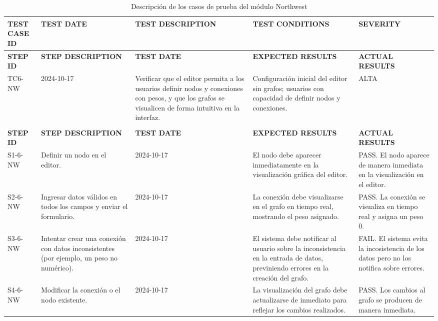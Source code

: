 \begin{longtable}{|p{2cm}|p{3cm}|p{3cm}|p{3cm}|p{3cm}|}
\caption{Descripción de los casos de prueba del módulo Northwest} \label{tab:casos_prueba} \\
\hline
\textbf{TEST CASE ID} & \textbf{TEST DATE} & \textbf{TEST DESCRIPTION} & \textbf{TEST CONDITIONS} & \textbf{SEVERITY                                                                                       \\} \\ \hline
\endfirsthead
\hline
\textbf{STEP ID} & \textbf{STEP DESCRIPTION} & \textbf{TEST DATE} & \textbf{EXPECTED RESULTS} & \textbf{ACTUAL RESULTS} \\ \hline
\endhead
TC6-NW & 2024-10-17 & Verificar que el editor permita a los usuarios definir nodos y conexiones con pesos, y que los grafos se visualicen de forma intuitiva en la interfaz. & Configuración inicial del editor sin grafos; usuarios con capacidad de definir nodos y conexiones. & ALTA                                                                                           \\ \\ \hline
\textbf{STEP ID} & \textbf{STEP DESCRIPTION} & \textbf{TEST DATE} & \textbf{EXPECTED RESULTS} & \textbf{ACTUAL RESULTS} \\ \hline
S1-6-NW & Definir un nodo en el editor. & 2024-10-17 & El nodo debe aparecer inmediatamente en la visualización gráfica del editor. & PASS. El nodo aparece de manera inmediata en la visualización en el editor. \\ \hline
S2-6-NW & Ingresar datos válidos en todos los campos y enviar el formulario. & 2024-10-17 & La conexión debe visualizarse en el grafo en tiempo real, mostrando el peso asignado. & PASS. La conexión se visualiza en tiempo real y asigna un peso 0. \\ \hline
S3-6-NW & Intentar crear una conexión con datos inconsistentes (por ejemplo, un peso no numérico). & 2024-10-17 & El sistema debe notificar al usuario sobre la inconsistencia en la entrada de datos, previniendo errores en la creación del grafo. & FAIL. El sistema evita la incosistencia de los datos pero no los notifica sobre errores. \\ \hline
S4-6-NW & Modificar la conexión o el nodo existente. & 2024-10-17 & La visualización del grafo debe actualizarse de inmediato para reflejar los cambios realizados. & PASS. Los cambios al grafo se producen de manera inmediata. \\ \hline
\end{longtable}